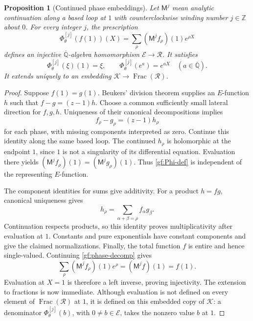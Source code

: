\documentclass[11pt,a4paper]{article}
\numberwithin{equation}{section}
\newtheorem{proposition}[theorem]{Proposition}
\theoremstyle{definition}
\theoremstyle{remark}
\newcommand{\A}{\overline{\mathbb Q}}
\newcommand{\Er}{\mathcal E}
\newcommand{\K}{\mathcal K}
\begin{document}
\begin{proposition}[Continued phase embeddings]\label{gf:windings}
Let $\mathsf M^j$ mean analytic continuation along a based loop at $1$
with counterclockwise winding number $j\in\mathbb Z$ about $0$.
For every integer $j$, the prescription
\begin{equation}\label{gf:Phi-def}
 \Phi_\theta^{[j]}(f(1))(X)
       =\sum_\rho(\mathsf M^j f_\rho)(1)e^{\rho X}
\end{equation}
defines an injective $\A$-algebra homomorphism $\Er\longrightarrow
\mathcal R$.  It satisfies
\begin{equation}\label{gf:Phi-normalization}
 \Phi_\theta^{[j]}(\xi)(1)=\xi,
 \qquad \Phi_\theta^{[j]}(e^a)=e^{aX}\quad(a\in\A).
\end{equation}
It extends uniquely to an embedding
$\K\longrightarrow\operatorname{Frac}(\mathcal R)$.
\end{proposition}
\begin{proof}
Suppose $f(1)=g(1)$.  Beukers' division theorem supplies an $E$-function
$h$ such that $f-g=(z-1)h$.  Choose a common sufficiently small lateral
direction for $f,g,h$.  Uniqueness of their canonical decompositions
implies
\[
 f_\rho-g_\rho=(z-1)h_\rho
\]
for each phase, with missing components interpreted as zero.  Continue
this identity along the same based loop.  The continued $h_\rho$ is
holomorphic at the endpoint $1$, since $1$ is not a singularity of its
differential equation.  Evaluation there yields
$(\mathsf M^j f_\rho)(1)=(\mathsf M^j g_\rho)(1)$.  Thus
\eqref{gf:Phi-def} is independent of the representing $E$-function.

The component identities for sums give additivity.  For a product
$h=fg$, canonical uniqueness gives
\[
 h_\rho=\sum_{\alpha+\beta=\rho}f_\alpha g_\beta.
\]
Continuation respects products, so this identity proves multiplicativity
after evaluation at $1$.  Constants and pure exponentials have constant
components and give the claimed normalizations.  Finally, the total
function $f$ is entire and hence single-valued.  Continuing
\eqref{gf:phase-decomp} gives
\[
 \sum_\rho(\mathsf M^j f_\rho)(1)e^\rho
       =(\mathsf M^j f)(1)=f(1).
\]
Evaluation at $X=1$ is therefore a left inverse, proving injectivity.
The extension to fractions is now immediate.  Although evaluation is
not defined on every element of $\operatorname{Frac}(\mathcal R)$ at
$1$, it is defined on this embedded copy of $\K$: a denominator
$\Phi_\theta^{[j]}(b)$, with $0\ne b\in\Er$, takes the nonzero value
$b$ at $1$.
\end{proof}
\end{document}
